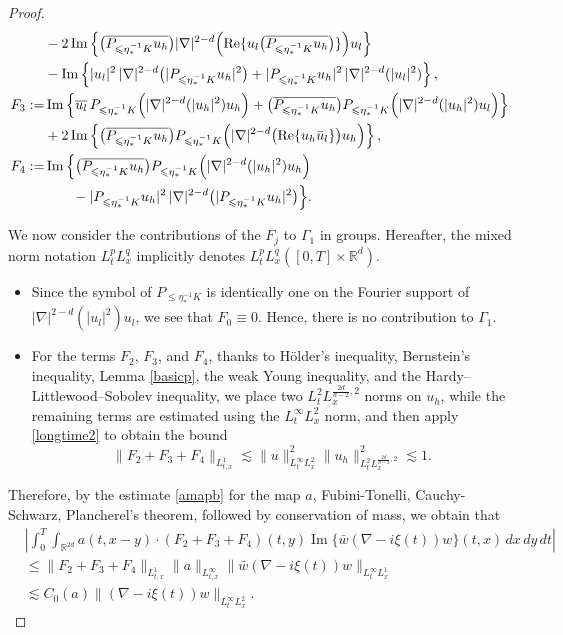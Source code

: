 \documentclass[reqno,11pt]{amsart}
\theoremstyle{plain}
\theoremstyle{definition}
\numberwithin{equation}{section}
\numberwithin{theorem}{section}
\def\leq{\leqslant}
\begin{document}
\begin{proof}
\begin{align*}
&- 2\operatorname{Im}\left\{ \bigl(\overline{P_{\leq \eta_{\ast}^{-1}K} u_h}\bigr) |\nabla|^{2-d}\Bigl(\operatorname{Re}\{u_l \bigl(\overline{P_{\leq \eta_{\ast}^{-1}K} u_h}\bigr)\}\Bigr) u_l \right\} \\
& - \operatorname{Im}\left\{ |u_l|^2 \, |\nabla|^{2-d}\bigl(|P_{\leq \eta_{\ast}^{-1}K} u_h|^2\bigr) + |P_{\leq \eta_{\ast}^{-1}K} u_h|^2 \, |\nabla|^{2-d}(|u_l|^2) \right\}, \\
F_3 :=& \operatorname{Im}\left\{ \overline{u_l} \, P_{\leq \eta_{\ast}^{-1}K}\Bigl(|\nabla|^{2-d}(|u_h|^2) u_h\Bigr) 
+ \bigl(\overline{P_{\leq \eta_{\ast}^{-1}K} u_h}\bigr) P_{\leq \eta_{\ast}^{-1}K}\Bigl(|\nabla|^{2-d}(|u_h|^2) u_l\Bigr) \right\} \\
& + 2\operatorname{Im}\left\{ \bigl(\overline{P_{\leq \eta_{\ast}^{-1}K} u_h}\bigr) P_{\leq \eta_{\ast}^{-1}K}\Bigl(|\nabla|^{2-d}\bigl(\operatorname{Re}\{u_h \bar{u}_l\}\bigr) u_h\Bigr) \right\}, \\
F_4 :=& \operatorname{Im}\Big\{ \bigl(\overline{P_{\leq \eta_{\ast}^{-1}K} u_h}\bigr) P_{\leq \eta_{\ast}^{-1}K}\Bigl(|\nabla|^{2-d}(|u_h|^2) u_h\Bigr) \\
&\qquad- |P_{\leq \eta_{\ast}^{-1}K} u_h|^2 \, |\nabla|^{2-d}\bigl(|P_{\leq \eta_{\ast}^{-1}K} u_h|^2\bigr) \Big\}.
\end{align*}

We now consider the contributions of the $F_j$ to $\Gamma_1$ in groups. Hereafter, the mixed norm notation $L_t^p L_x^q$ implicitly denotes $L_t^p L_x^q([0, T] \times \mathbb{R}^d)$.

\begin{itemize}
\item Since the symbol of $P_{\leq \eta_{\ast}^{-1}K}$ is identically one on the Fourier support of $|\nabla|^{2-d}(|u_{l}|^2)u_{l}$, we see that $F_0 \equiv 0$. Hence, there is no contribution to $\Gamma_1$.

\item For the terms $F_2$, $F_3$, and $F_4$, thanks to H\"older's inequality, Bernstein's inequality, Lemma \ref{basicp}, the weak Young inequality, and the Hardy–Littlewood–Sobolev inequality, we place two $L_t^{2}L_x^{\frac{2d}{d-2},2}$ norms on $u_h$, while the remaining terms are estimated using the $L_t^{\infty}L_x^2$ norm, and then apply \eqref{longtime2} to obtain the bound
\[
\|F_2 + F_3 + F_4\|_{L_{t,x}^1} \lesssim \|u\|^2_{L_t^{\infty}L_x^2} \|u_h\|^2_{L_t^2L_x^{\frac{2d}{d-2},2}}\lesssim 1.
\]
\end{itemize}
Therefore, by the estimate \eqref{amapb} for the map $a$, Fubini-Tonelli, Cauchy-Schwarz, Plancherel's theorem, followed by conservation of mass, we obtain that
\[
\begin{aligned}
&\left| \int_0^{T} \int_{\mathbb{R}^{2d}} a(t, x - y) \cdot (F_2 + F_3 + F_4)(t, y) \operatorname{Im}\{\bar{w}(\nabla - i\xi(t))w\}(t, x) \,dx\,dy\,dt \right| \\
&\leq \|F_2 + F_3 + F_4\|_{L_{t,x}^1} \|a\|_{L_{t,x}^{\infty}} \|\bar{w}(\nabla - i\xi(t))w\|_{L_t^\infty L_x^1} \\
&\lesssim C_0(a)\|(\nabla - i\xi(t))w\|_{L_t^\infty L_x^2}.
\end{aligned}
\]


\end{proof}
\end{document}
